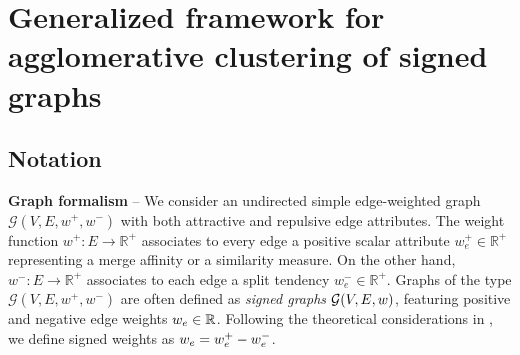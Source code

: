 
\section{Generalized framework for agglomerative clustering of signed graphs} \label{sec:general_framework}

\subsection{Notation} \label{sec:notation}

\textbf{Graph formalism} -- We consider an undirected simple edge-weighted graph $\mathcal{G}(V,E,w^+, w^-)$ with both attractive and repulsive edge attributes.
The weight function $w^+: E \rightarrow \mathbb{R}^+$ associates to every edge a positive scalar attribute $w_e^+\in \mathbb{R}^+$ representing a merge affinity or a similarity measure.
On the other hand, $w^-: E \rightarrow \mathbb{R}^+$ associates to each edge a split tendency $w_e^- \in \mathbb{R}^+$.
Graphs of the type $\mathcal{G}(V,E,w^+, w^-)$ are often defined as \emph{signed graphs} $\mathcal{G}(V,E,w)$, featuring positive and negative edge weights $w_e\in \mathbb{R}$. Following the theoretical considerations in \cite{lange2018partial}, we define signed weights as ${w_e = w_e^+ - w_e^-}$. 


